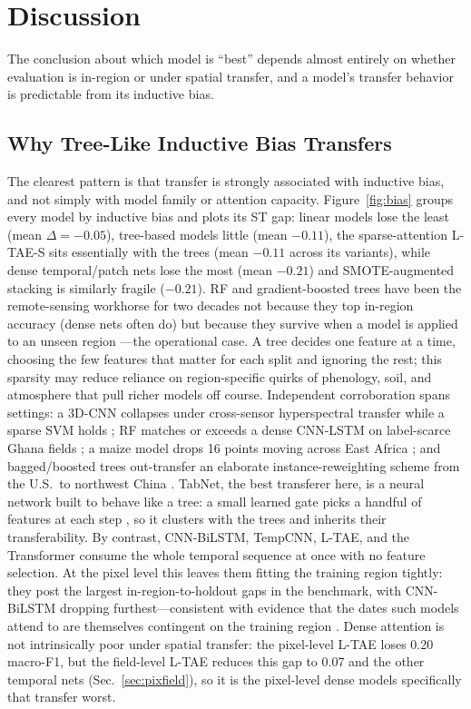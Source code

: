 \documentclass[journal]{IEEEtran}
\begin{document}
\section{Discussion}
\label{sec:discussion}
The conclusion about which model is ``best'' depends almost entirely on whether evaluation is in-region or under spatial transfer, and a model's transfer behavior is predictable from its inductive bias.

\subsection{Why Tree-Like Inductive Bias Transfers}
The clearest pattern is that transfer is strongly associated with inductive bias, and not simply with model family or attention capacity. Figure~\ref{fig:bias} groups every model by inductive bias and plots its ST gap: linear models lose the least (mean $\Delta=-0.05$), tree-based models little (mean $-0.11$), the sparse-attention L-TAE-S sits essentially with the trees (mean $-0.11$ across its variants), while dense temporal/patch nets lose the most (mean $-0.21$) and SMOTE-augmented stacking is similarly fragile ($-0.21$). RF and gradient-boosted trees have been the remote-sensing workhorse for two decades not because they top in-region accuracy (dense nets often do) but because they survive when a model is applied to an unseen region \cite{belgiu2016, maxwell2019}---the operational case. A tree decides one feature at a time, choosing the few features that matter for each split and ignoring the rest; this sparsity may reduce reliance on region-specific quirks of phenology, soil, and atmosphere that pull richer models off course. Independent corroboration spans settings: a 3D-CNN collapses under cross-sensor hyperspectral transfer while a sparse SVM holds \cite{pankajakshan2025}; RF matches or exceeds a dense CNN-LSTM on label-scarce Ghana fields \cite{rustowicz2019}; a maize model drops 16 points moving across East Africa \cite{jin2019}; and bagged/boosted trees out-transfer an elaborate instance-reweighting scheme from the U.S.\ to northwest China \cite{mai2025}. TabNet, the best transferer here, is a neural network built to behave like a tree: a small learned gate picks a handful of features at each step \cite{tabnet_orig}, so it clusters with the trees and inherits their transferability. By contrast, CNN-BiLSTM, TempCNN, L-TAE, and the Transformer consume the whole temporal sequence at once with no feature selection. At the pixel level this leaves them fitting the training region tightly: they post the largest in-region-to-holdout gaps in the benchmark, with CNN-BiLSTM dropping furthest---consistent with evidence that the dates such models attend to are themselves contingent on the training region \cite{obadic2022}. Dense attention is not intrinsically poor under spatial transfer: the pixel-level L-TAE loses 0.20 macro-F1, but the field-level L-TAE reduces this gap to 0.07 and the other temporal nets (Sec.~\ref{sec:pixfield}), so it is the pixel-level dense models specifically that transfer worst.
\end{document}
